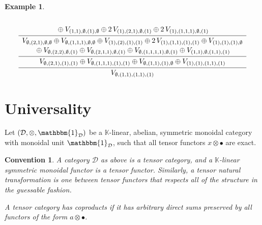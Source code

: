 \documentclass[11pt]{article}
\theoremstyle{plain}
\theoremstyle{nonumberplain}
\theoremstyle{plain}
\newtheorem{example}[lemma]{Example}
\newtheorem{convention}[lemma]{Convention}
\theoremstyle{nonumberplain}
\newcommand\bK{\mathbb K}
\newcommand\bT{\mathbb T}
\newcommand\cD{\mathcal D}
\begin{document}
\begin{example}
$$\begin{array}{c}
	\\\vphantom{1^{1^1}}
	\oplus V_{(1,1),\emptyset,(1),\emptyset}\oplus 2\,V_{(1),(2,1),\emptyset,(1)} \oplus 2\,V_{(1),(1,1,1),\emptyset,(1)} 	
	\\[0.03in]\hline\vphantom{1^{1^1}}
	V_{\emptyset,(2,1),\emptyset,\emptyset}\oplus V_{\emptyset,(1,1,1),\emptyset,\emptyset}\oplus V_{(1),(2),(1),(1)} \oplus 2\,V_{(1),(1,1),(1),(1)}\oplus V_{(1),(1),(1),\emptyset}
	\\\vphantom{1^{1^1}}
	\oplus V_{\emptyset,(2,2),\emptyset,(1)} \oplus V_{\emptyset,(2,1,1),\emptyset,(1)}\oplus V_{\emptyset,(1,1,1,1),\emptyset,(1)}\oplus V_{(1,1),\emptyset,(1,1),(1)}
	\\[0.03in]\hline\vphantom{1^{1^1}}
	V_{\emptyset,(2,1),(1),(1)}\oplus V_{\emptyset,(1,1,1),(1),(1)}\oplus V_{\emptyset,(1,1),(1),\emptyset} \oplus V_{(1),(1),(1,1),(1)}
	\\[0.03in]\hline\vphantom{1^{1^1}}
	V_{\emptyset,(1,1),(1,1),(1)}
\end{array}
$$
\end{example}

\section{Universality}\label{se.univ}





Let $(\cD,\otimes,\mathbbm{1}_\cD)$ be a $\bK$-linear, abelian, symmetric
monoidal category with monoidal unit $\mathbbm{1}_\cD$, such that
all tensor functors $x\otimes \bullet$ are exact. 

\begin{convention}\label{cv.ccpl}
  A category $\cD$ as above is a {\it tensor category}, and a
  $\bK$-linear symmetric monoidal functor is a {\it tensor
    functor}. Similarly, a {\it tensor natural transformation} is one
  between tensor functors that respects all of the structure in the
  guessable fashion.
  
  A tensor category {\it has coproducts} if it has
  arbitrary direct sums preserved by all functors of the form
  $a\otimes \bullet$.
\end{convention}
\end{document}
